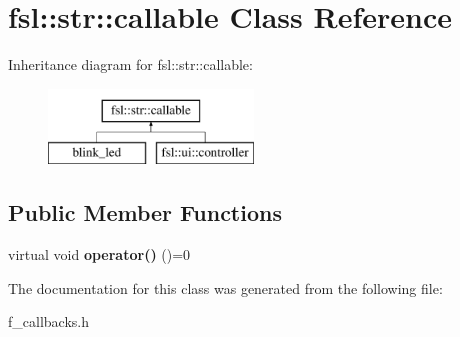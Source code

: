 \hypertarget{classfsl_1_1str_1_1callable}{}\section{fsl\+::str\+::callable Class Reference}
\label{classfsl_1_1str_1_1callable}
Inheritance diagram for fsl\+::str\+::callable\+:\begin{figure}[H]
\begin{center}
\leavevmode
\includegraphics[height=2.000000cm]{classfsl_1_1str_1_1callable}
\end{center}
\end{figure}
\subsection*{Public Member Functions}
\begin{DoxyCompactItemize}
\item 
\mbox{\label{classfsl_1_1str_1_1callable_a6a1832ea7c9ac1a3ba5b99a963e0276d}} 
virtual void {\bfseries operator()} ()=0
\end{DoxyCompactItemize}


The documentation for this class was generated from the following file\+:\begin{DoxyCompactItemize}
\item 
f\+\_\+callbacks.\+h\end{DoxyCompactItemize}

